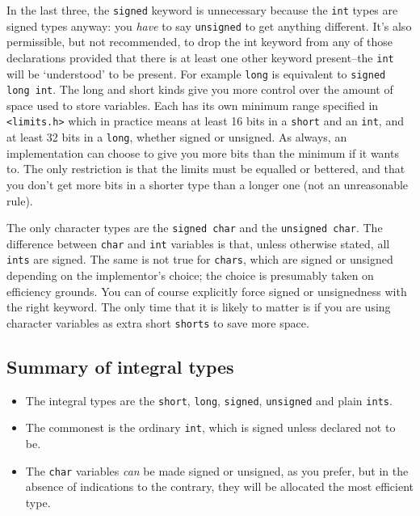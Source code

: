   In the last three, the \texttt{signed} keyword is unnecessary
    because the \texttt{int} types are signed types anyway: you
    \textit{have} to say \texttt{unsigned} to get anything different. It's
    also permissible, but not recommended, to drop the int keyword from any of
    those declarations provided that there is at least one other keyword
    present--the \texttt{int} will be `understood' to be
    present. For example \texttt{long} is equivalent to \texttt{signed long
    int}. The long and short kinds give you more control over the amount
    of space used to store variables. Each has its own minimum range specified
    in \texttt{<limits.h>} which in practice means at least
    16 bits in a \texttt{short} and an \texttt{int}, and at least
    32 bits in a \texttt{long}, whether signed or unsigned. As
    always, an implementation can choose to give you more bits than the
    minimum if it wants to. The only restriction is that the limits must be
    equalled or bettered, and that you don't get more bits in a shorter type
    than a longer one (not an unreasonable rule).


   The only character types are the \texttt{signed char} and the
    \texttt{unsigned char}. The difference between \texttt{char} and
    \texttt{int} variables is that, unless otherwise stated, all
    \texttt{ints} are signed. The same is not true for \texttt{chars},
    which are signed or unsigned depending on the implementor's choice; the
    choice is presumably taken on efficiency grounds. You can of course
    explicitly force signed or unsignedness with the right keyword. The only
    time that it is likely to matter is if you are using character variables
    as extra short \texttt{shorts} to save more space.


  

  \subsection{Summary of integral types}

   \begin{itemize}
    \item The integral types are the \texttt{short}, \texttt{long},
     \texttt{signed}, \texttt{unsigned} and plain
     \texttt{ints}.
    \item The commonest is the ordinary \texttt{int}, which is signed unless
     declared not to be.
    \item The \texttt{char} variables \textit{can} be made signed or
     unsigned, as you prefer, but in the absence of indications to the
     contrary, they will be allocated the most efficient type.
   \end{itemize}

